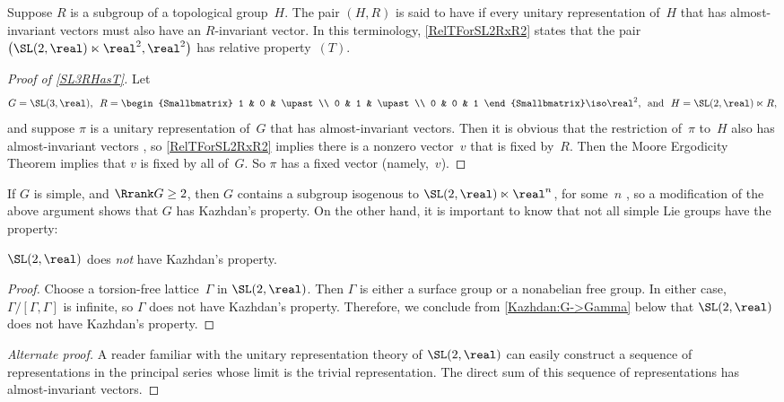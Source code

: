 \begin{terminology*}
Suppose $R$ is a subgroup of a topological group~$H$. The pair $(H,R)$ is said to have  if every unitary representation of~$H$ that has almost-invariant vectors must also have an $R$-invariant vector. In this terminology, \cref{RelTForSL2RxR2} states that the pair $\bigl( \SL(2,\real) \ltimes \real^2, \real^2 \bigr)$ has relative property~$(T)$.
\end{terminology*}

\begin{proof}[Proof of \cref{SL3RHasT}]
Let 
	$$ \text{$G = \SL(3,\real) $,
	\ 
	$R = 
	\begin{Smallbmatrix}
	1 & 0 & \upast \\
	0 & 1 & \upast \\
	0 & 0 & 1 
	\end{Smallbmatrix}
	\iso \real^2$,
	\ 
	and
	\ 
	$H = 
	\SL(2,\real) \ltimes R$}
	, $$
and suppose $\pi$ is a unitary representation of~$G$ that has almost-invariant vectors. Then it is obvious that the restriction of~$\pi$ to~$H$ also has almost-invariant vectors , so \cref{RelTForSL2RxR2} implies there is a nonzero vector~$v$ that is fixed by~$R$.
Then the {Moore Ergodicity Theorem}  implies that $v$ is fixed by all of~$G$.
So $\pi$ has a fixed vector (namely,~$v$).
\end{proof}

If $G$ is simple, and $\Rrank G \ge 2$, then $G$ contains a subgroup isogenous to $\SL(2,\real) \ltimes \real^n$, for some~$n$ , so a modification of the above argument shows that $G$ has Kazhdan's property. On the other hand, it is important to know that not all simple Lie groups have the property:

\begin{eg}
 $\SL(2,\real)$ does \emph{not} have Kazhdan's property.
 \end{eg}
 
 \begin{proof}
 Choose a torsion-free lattice~$\Gamma$ in
$\SL(2,\real)$. Then $\Gamma$ is either a surface group or
a nonabelian free group. In either case,
$\Gamma/[\Gamma,\Gamma]$ is infinite, so $\Gamma$ does not
have Kazhdan's property. Therefore, we conclude from
\cref{Kazhdan:G->Gamma} below that $\SL(2,\real)$ does not
have Kazhdan's property.
\end{proof}

\begin{proof}[Alternate proof]
A reader familiar with the unitary representation theory of $\SL(2,\real)$ can easily construct a sequence of representations in the principal series  whose limit is the trivial representation. The 
direct sum of this sequence of representations has almost-invariant vectors.
 \end{proof}

